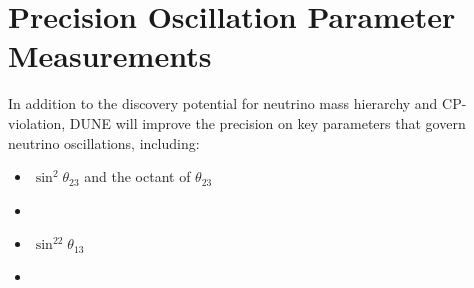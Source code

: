 \section{Precision Oscillation Parameter Measurements}

In addition to the discovery potential for neutrino mass hierarchy and CP-violation, 
DUNE will improve the precision on key parameters that govern neutrino oscillations, including:
\begin{itemize}
 \item $\sin^2\theta_{23}$ and the octant of $\theta_{23}$
 \item \deltacp
 \item $\sin^22\theta_{13}$
 \item {}
\end{itemize}

